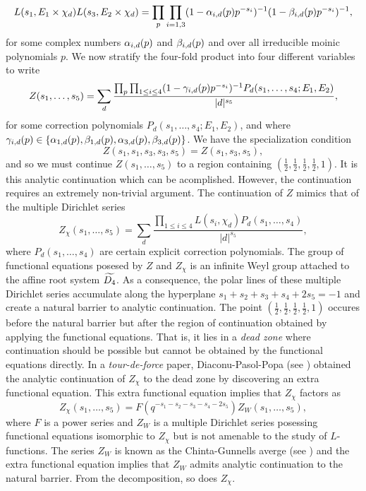 \documentclass[12pt,reqno,oneside]{amsart}
\begin{document}
\[
  L(s_{1},E_{1} \times \chi_{d})L(s_{3},E_{2} \times \chi_{d}) = \prod_{p}\prod_{i = 1,3}(1-\alpha_{i,d}(p)p^{-s_{i}})^{-1}(1-\beta_{i,d}(p)p^{-s_{i}})^{-1},
\]
for some complex numbers $\alpha_{i,d}(p)$ and $\beta_{i,d}(p)$ and over all irreducible moinic polynomials $p$. We now stratify the four-fold product into four different variables to write
\[
  Z(s_{1},\ldots,s_{5}) = \sum_{d}\frac{\prod_{p}\prod_{1 \le i \le 4}(1-\gamma_{i,d}(p)p^{-s_{i}})^{-1}P_{d}(s_{1},\ldots,s_{4};E_{1},E_{2})}{|d|^{s_{5}}},
\]
for some correction polynomials $P_{d}(s_{1},\ldots,s_{4};E_{1},E_{2})$, and where $\gamma_{i,d}(p) \in \{\alpha_{1,d}(p),\beta_{1,d}(p),\alpha_{3,d}(p),\beta_{3,d}(p)\}$. We have the specialization condition
\[
  Z(s_{1},s_{1},s_{3},s_{3},s_{5}) = Z(s_{1},s_{3},s_{5}), 
\]
and so we must continue $Z(s_{1},\ldots,s_{5})$ to a region containing $\left(\frac{1}{2},\frac{1}{2},\frac{1}{2},\frac{1}{2},1\right)$. It is this analytic continuation which can be acomplished. However, the continuation requires an extremely non-trivial argument. The continuation of $Z$ mimics that of the multiple Dirichlet series
\[
  Z_{\chi}(s_{1},\ldots,s_{5}) = \sum_{d}\frac{\prod_{1 \le i \le 4}L(s_{i},\chi_{d})P_{d}(s_{1},\ldots,s_{4})}{|d|^{s_{5}}},
\]
where $P_{d}(s_{1},\ldots,s_{4})$ are certain explicit correction polynomials. The group of functional equations posesed by $Z$ and $Z_{\chi}$ is an infinite Weyl group attached to the affine root system $\widetilde{D_{4}}$. As a consequence, the polar lines of these multiple Dirichlet series accumulate along the hyperplane $s_{1}+s_{2}+s_{3}+s_{4}+2s_{5} = -1$ and create a natural barrier to analytic continuation. The point $\left(\frac{1}{2},\frac{1}{2},\frac{1}{2},\frac{1}{2},1\right)$ occures before the natural barrier but after the region of continuation obtained by applying the functional equations. That is, it lies in a \textit{dead zone} where continuation should be possible but cannot be obtained by the functional equations directly. In a \textit{tour-de-force} paper, Diaconu-Pasol-Popa (see ) obtained the analytic continuation of $Z_{\chi}$ to the dead zone by discovering an extra functional equation. This extra functional equation implies that $Z_{\chi}$ factors as
\[
  Z_{\chi}(s_{1},\ldots,s_{5}) = F(q^{-s_{1}-s_{2}-s_{3}-s_{4}-2s_{5}})Z_{W}(s_{1},\ldots,s_{5}),
\]
where $F$ is a power series and $Z_{W}$ is a multiple Dirichlet series posessing functional equations isomorphic to $Z_{\chi}$ but is not amenable to the study of $L$-functions. The series $Z_{W}$ is known as the Chinta-Gunnells averge (see ) and the extra functional equation implies that $Z_{W}$ admits analytic continuation to the natural barrier. From the decomposition, so does $Z_{\chi}$.
\end{document}
